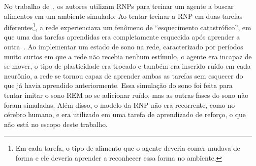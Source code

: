 No trabalho de~, os autores utilizam RNPs para treinar um agente a buscar alimentos em um ambiente
simulado. Ao tentar treinar a RNP em duas tarefas diferentes\footnote{Em cada tarefa, o tipo de alimento que o agente deveria
comer mudava de forma e ele deveria aprender a reconhecer essa forma no ambiente.}, a rede experienciava um fenômeno de
``esquecimento catastrófico'', em que uma das tarefas aprendidas era completamente esquecida após aprender a
outra~\cite{hasselmoAvoiding2017}. Ao implementar um estado de sono na rede, caracterizado por períodos muito curtos em que a rede
não recebia nenhum estímulo, o agente era incapaz de se mover, o tipo de plasticidade era trocado e também era inserido ruído em
cada neurônio, a rede se tornou capaz de aprender ambas as tarefas sem esquecer do que já havia aprendido anteriormente. Essa
simulação do sono foi feita para tentar imitar o sono REM ao se adicionar ruído, mas as outras fases do sono não foram simuladas.
Além disso, o modelo da RNP não era recorrente, como no cérebro humano, e era utilizado em uma tarefa de aprendizado de reforço, o
que não está no escopo deste trabalho.

